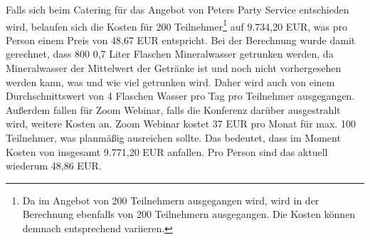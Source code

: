 Falls sich beim Catering für das Angebot von Peters Party Service entschieden wird, belaufen sich die Kosten für 200 Teilnehmer\footnote{Da im Angebot von 200 Teilnehmern ausgegangen wird, wird in der Berechnung ebenfalls von 200 Teilnehmern ausgegangen. Die Kosten können demnach entsprechend variieren.} auf 9.734,20 EUR, was pro Person einem Preis von 48,67 EUR entspricht. Bei der Berechnung wurde damit gerechnet, dass 800 0,7 Liter Flaschen Mineralwasser getrunken werden, da Mineralwasser der Mittelwert der Getränke ist und noch nicht vorhergesehen werden kann, was und wie viel getrunken wird. Daher wird auch von einem Durchschnittswert von 4 Flaschen Wasser pro Tag pro Teilnehmer ausgegangen. Außerdem fallen für Zoom Webinar, falls die Konferenz darüber ausgestrahlt wird, weitere Kosten an. Zoom Webinar kostet 37 EUR pro Monat für max. 100 Teilnehmer, was planmäßig ausreichen sollte. Das bedeutet, dass im Moment Kosten von insgesamt 9.771,20 EUR anfallen. Pro Person sind das aktuell wiederum 48,86 EUR. 

